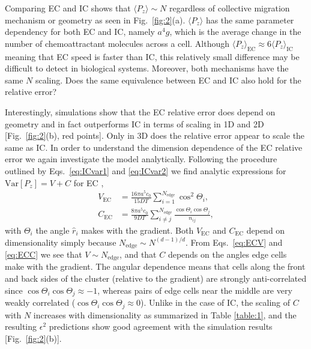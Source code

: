 Comparing EC and IC shows that $\langle P_z \rangle \sim N$ regardless of collective migration mechanism or geometry as seen in Fig.\ \ref{fig:2}(a). $\langle P_z \rangle$ has the same parameter dependency for both EC and IC, namely $a^4g$, which is the average change in the number of chemoattractant molecules across a cell. Although
$\langle P_z \rangle_\text{EC} \approx 6 \langle P_z \rangle_\text{IC}$
meaning that EC speed is faster than IC, this relatively small difference may be difficult to detect in biological systems. Moreover, both mechanisms have the same $N$ scaling.
Does the same equivalence between EC and IC also hold for the relative error?

Interestingly, simulations show that the EC relative error does depend on geometry and in fact outperforms IC in terms of scaling in 1D and 2D [Fig.\ \ref{fig:2}(b), red points]. Only in 3D does the relative error appear to scale the same as IC. In order to understand the dimension dependence of the EC relative error we again investigate the model analytically.
Following the procedure outlined by Eqs.\ \ref{eq:ICvar1} and \ref{eq:ICvar2} we find analytic expressions for $\text{Var}[P_z] = V + C$ for EC \cite{supinfo},
\begin{align}
    V_\text{EC} &= \frac{16\pi a^5c_0}{15DT} \sum_{i=1}^{N_\text{edge}} \cos^2\Theta_i \label{eq:ECV} , \\
    C_\text{EC} &= \frac{8\pi a^5c_0}{9DT} \sum_{i \neq j}^{N_\text{edge}} \frac{\cos\Theta_i\cos\Theta_j}{n_{ij}} , \label{eq:ECC}
\end{align}
with $\Theta_i$ the angle $\hat{r}_i$ makes with the gradient. Both $V_\text{EC}$ and $C_\text{EC}$ depend on dimensionality simply because $N_\text{edge} \sim N^{(d-1)/d}$. From Eqs.\ \ref{eq:ECV} and \ref{eq:ECC} we see that
$V \sim N_\text{edge}$,
and that $C$ depends on the angles edge cells make with the gradient. The angular dependence means that cells along the front and back sides of the cluster (relative to the gradient) are strongly anti-correlated since $\cos\Theta_i\cos\Theta_j \approx -1$,
whereas pairs of edge cells near the middle are very weakly correlated ($\cos\Theta_i\cos\Theta_j \approx 0$). Unlike in the case of IC, the scaling of $C$ with $N$ increases with dimensionality \cite{supinfo} as summarized in Table \ref{table:1}, and the resulting $\epsilon^2$ predictions show good agreement with the simulation results [Fig.\ \ref{fig:2}(b)].

